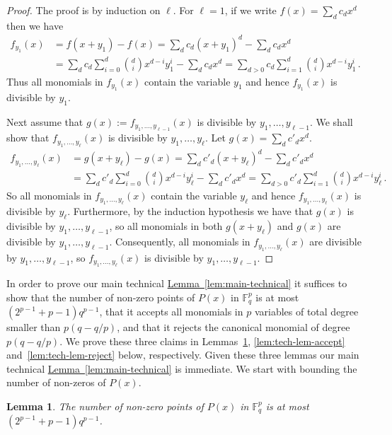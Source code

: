 \documentclass[10pt]{article}
\newtheorem{lemma}[theorem]{Lemma}
\theoremstyle{definition}
\numberwithin{equation}{section}
\newcommand{\expref}[2]{\texorpdfstring{\hyperref[#2]{#1~\ref{#2}}}{#1~\ref{#2}}}
\newcommand{\F}{{\mathbb{F}}}
\begin{document}
\begin{proof}
The proof is by induction on $\ell$. 
For $\ell =1$, if we write $f(x) = \sum_{d} c_d x^d$ then we have
%
\begin{align*}
f_{y_1}(x) & =  f(x+y_1) - f(x) = \sum_{d} c_d (x+y_1)^d - \sum_{d} c_d x^d \\
 & =   \sum_{d} c_d \sum_{i=0}^d \binom {d} {i} x^{d-i} y_1^{i} - \sum_{d} c_d x^d = \sum_{d >0} c_d \sum_{i=1}^d \binom {d} {i} x^{d-i} y_1^{i}\,.
\end{align*}
%
Thus all monomials in $f_{y_1}(x)$ contain the variable $y_1$ and hence $f_{y_1}(x)$ is divisible by $y_1$.

Next assume that $g(x):=f_{y_1,\ldots,y_{\ell -1}}(x)$ is divisible by $y_1,\ldots,y_{\ell-1}$. We shall show that $f_{y_1,\ldots,y_{\ell}}(x)$ is divisible by $y_1,\ldots,y_{\ell}$. Let $g(x)=\sum_{d} c'_d x^d$.
\begin{align*}
f_{y_1,\ldots,y_{\ell}}(x) & =  g(x+y_{\ell}) - g(x) = \sum_{d} c'_d (x+y_\ell)^d - \sum_{d} c'_d x^d \\
 & =   \sum_{d} c'_d \sum_{i=0}^d \binom {d} {i} x^{d-i} y_\ell^{i} - \sum_{d} c'_d x^d = \sum_{d >0} c'_d \sum_{i=1}^d \binom {d} {i} x^{d-i} y_\ell^{i}\,.
\end{align*}
So all monomials in $f_{y_1,\ldots,y_{\ell}}(x)$ contain the variable $y_\ell$ and hence $f_{y_1,\ldots,y_{\ell}}(x)$ is divisible by $y_\ell$. Furthermore, by the induction hypothesis we have that $g(x)$ is divisible by $y_1,\ldots,y_{\ell-1}$, so all monomials in both $g(x+y_{\ell})$ and $g(x)$ are divisible by $y_1,\ldots,y_{\ell-1}$. Consequently, all monomials in  $f_{y_1,\ldots,y_{\ell}}(x)$ are divisible by $y_1,\ldots,y_{\ell-1}$, so   $f_{y_1,\ldots,y_{\ell}}(x)$ is divisible by $y_1,\ldots,y_{\ell-1}$.
\end{proof}

In order to prove our main technical \expref{Lemma}{lem:main-technical} it suffices to show that the number of non-zero points of $P(x)$ in $\F_{q}^p$ is at most
$(2^{p-1}+p-1)q^{p-1}$, that it accepts all monomials in $p$ variables of total degree smaller than $p(q-q/p)$, and that it rejects the canonical monomial of degree $
p(q-q/p)$. We prove these three claims in Lemmas~\ref{lem:tech-lem-non-zeros}, \ref{lem:tech-lem-accept} and~\ref{lem:tech-lem-reject} below, respectively. Given these three
lemmas our main technical \expref{Lemma}{lem:main-technical} is immediate. We start with bounding the number of non-zeros of $P(x)$.

\begin{lemma}\label{lem:tech-lem-non-zeros}
The number of non-zero points of $P(x)$ in $\F_{q}^p$ is at most $(2^{p-1}+p-1)q^{p-1}$.
\end{lemma}
\end{document}
